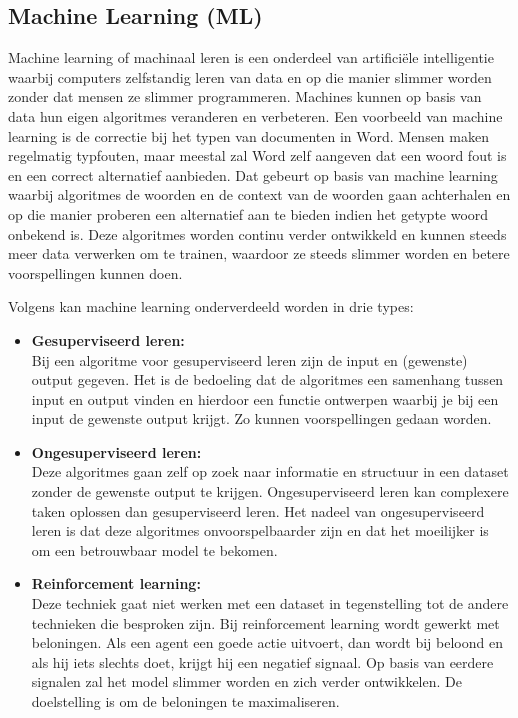 \subsection{Machine Learning (ML)}
\label{subsec:begrippen-ml}


Machine learning of machinaal leren is een onderdeel van artificiële intelligentie waarbij computers zelfstandig leren van data en op die manier slimmer worden zonder dat mensen ze slimmer programmeren. Machines kunnen op basis van data hun eigen algoritmes veranderen en verbeteren. Een voorbeeld van machine learning is de correctie bij het typen van documenten in Word. Mensen maken regelmatig typfouten, maar meestal zal Word zelf aangeven dat een woord fout is en een correct alternatief aanbieden. Dat gebeurt op basis van machine learning waarbij algoritmes de woorden en de context van de woorden gaan achterhalen en op die manier proberen een alternatief aan te bieden indien het getypte woord onbekend is. Deze algoritmes worden continu verder ontwikkeld en kunnen steeds meer data verwerken om te trainen, waardoor ze steeds slimmer worden en betere voorspellingen kunnen doen.


Volgens \textcite{Lievens2019} kan machine learning onderverdeeld worden in drie types:

\begin{itemize}
    \item \textbf{Gesuperviseerd leren:} \\
    
    Bij een algoritme voor gesuperviseerd leren zijn de input en (gewenste) output gegeven. Het is de bedoeling dat de algoritmes een samenhang tussen input en output vinden en hierdoor een functie ontwerpen waarbij je bij een input de gewenste output krijgt. Zo kunnen voorspellingen gedaan worden. \\
    
    \item \textbf{Ongesuperviseerd leren:} \\
    
    Deze algoritmes gaan zelf op zoek naar informatie en structuur in een dataset zonder de gewenste output te krijgen. Ongesuperviseerd leren kan complexere taken oplossen dan gesuperviseerd leren. Het nadeel van ongesuperviseerd leren is dat deze algoritmes onvoorspelbaarder zijn en dat het moeilijker is om een betrouwbaar model te bekomen. \\
    
    \item \textbf{Reinforcement learning:} \\
    
    Deze techniek gaat niet werken met een dataset in tegenstelling tot de andere technieken die besproken zijn. Bij reinforcement learning wordt gewerkt met beloningen. Als een agent een goede actie uitvoert, dan wordt bij beloond en als hij iets slechts doet, krijgt hij een negatief signaal. Op basis van eerdere signalen zal het model slimmer worden en zich verder ontwikkelen. De doelstelling is om de beloningen te maximaliseren. \\
\end{itemize}

